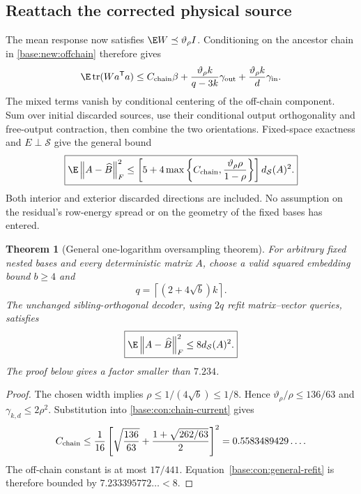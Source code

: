 \documentclass[11pt,oneside,openany,a4paper]{book}
\numberwithin{equation}{chapter}
\newtheorem{theorem}{Theorem}[chapter]
\theoremstyle{definition}
\theoremstyle{remark}
\newcommand{\T}{\mathsf T}\newcommand{\Id}{I}
\newcommand{\F}[1]{\left\lVert#1\right\rVert_F}
\DeclareMathOperator{\tr}{tr}\DeclareMathOperator{\rank}{rank}
\begin{document}
\subsection{Reattach the corrected physical source}
The mean response now satisfies $\E W\preceq\vartheta_\rho I$. Conditioning on the ancestor chain in \eqref{base:new:offchain} therefore gives
\begin{equation}\label{base:con:corrected-source-final}
 \E\tr(Wa^\T a)\le C_{\rm chain}\beta+
 \frac{\vartheta_\rho k}{q-3k}\gamma_{\rm out}
 +\frac{\vartheta_\rho k}{d}\gamma_{\rm in}.
\end{equation}
The mixed terms vanish by conditional centering of the off-chain component. Sum over initial discarded sources, use their conditional output orthogonality and free-output contraction, then combine the two orientations. Fixed-space exactness and $E\perp\mathcal S$ give the general bound
\begin{equation}\label{base:con:general-refit}
 \boxed{\E\F{A-\widehat B}^2\le
 \left[5+4\max\left\{C_{\rm chain},
 \frac{\vartheta_\rho\rho}{1-\rho}\right\}\right]d_{\mathcal S}(A)^2.}
\end{equation}
Both interior and exterior discarded directions are included. No assumption on the residual's row-energy spread or on the geometry of the fixed bases has entered.

\begin{theorem}[General one-logarithm oversampling theorem]\label{base:con:main-eight}
For arbitrary fixed nested bases and every deterministic matrix $A$, choose a valid squared embedding bound $b\ge4$ and
\begin{equation}\label{base:con:width}
 q=\left\lceil(2+4\sqrt b)k\right\rceil.
\end{equation}
The unchanged sibling-orthogonal decoder, using $2q$ refit matrix--vector queries, satisfies
\begin{equation}\label{base:con:eight}
 \boxed{\E\F{A-\widehat B}^2\le8d_{\mathcal S}(A)^2.}
\end{equation}
The proof below gives a factor smaller than $7.234$.
\end{theorem}
\begin{proof}
The chosen width implies $\rho\le1/(4\sqrt b)\le1/8$. Hence
$\vartheta_\rho/\rho\le136/63$ and $\gamma_{k,d}\le2\rho^2$. Substitution into \eqref{base:con:chain-current} gives
\[
 C_{\rm chain}\le\frac1{16}
 \left[\sqrt{\frac{136}{63}}+
 \frac{1+\sqrt{262/63}}2\right]^2
 =0.5583489429\ldots.
\]
The off-chain constant is at most $17/441$. Equation~\eqref{base:con:general-refit} is therefore bounded by
$7.233395772\ldots<8$.
\end{proof}
\end{document}

